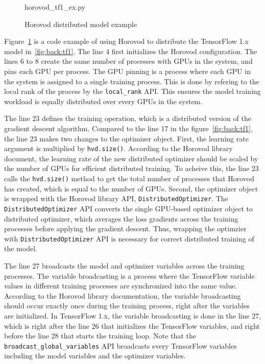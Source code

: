 \begin{figure}[ht!]
 
{horovod_tf1_ex.py}
  \caption{Horovod distributed model example}
\label{fig:back:hvd1} 
\end{figure}

Figure~\ref{fig:back:hvd1} is a code example of using Horovod to distribute
the TensorFlow 1.x model in~\ref{fig:back:tf1}.
The line 4 first initializes the Horovod configuration.
The lines 6 to 8 create the same number of processes with GPUs in the system,
and pins each GPU per process. 
The GPU pinning is a process where each GPU in the system is assigned to a 
single training process.
This is done by refering to the local rank of the process 
by the {\tt local\_rank} API.
This ensures the model training workload is equally distributed over
every GPUs in the system.

The line 23 defines the training operation, 
which is a distributed version of the gradient descent algorithm.
Compared to the line 17 in the figure~\ref{fig:back:tf1},
the line 23 makes two changes to the optimizer object.
First, the learning rate argument is multiplied by {\tt hvd.size()}.
According to the Horovod library document,
the learning rate of the new distributed optimizer 
should be scaled by the number of GPUs for efficient distributed training.
To acheive this, the line 23 calls the {\tt hvd.size()} method to
get the total number of processes that Horovod has created,
which is equal to the number of GPUs.
Second, the optimizer object is wrapped with the Horovod library API,
{\tt DistributedOptimizer}.
The {\tt DistributedOptimizer} API converts the single GPU-based optimizer 
object to distributed optimizer, which averages the loss gradients across the
training processes before applying the gradient descent.
Thus, wrapping the optimzier with {\tt DistributedOptimizer} API is necessary
for correct distributed training of the model.

The line 27 broadcasts the model and optimizer variables across the training
processes.
The variable broadcasting is a process where the TensorFlow 
variable values in different training processes are synchronized into
the same value.
According to the Horovod library documentation, the variable broadcasting
should occur exactly once during the training process,
right after the variables are initialized.
In TensorFlow 1.x, the variable broadcasting is done in the line 27,
which is right after the line 26 that initializes the TensorFlow variables,
and right before the line 28 that starts the training loop.
Note that the {\tt broadcast\_global\_variables} API broadcasts every
TensorFlow variables including the model variables and the optimizer
variables.

